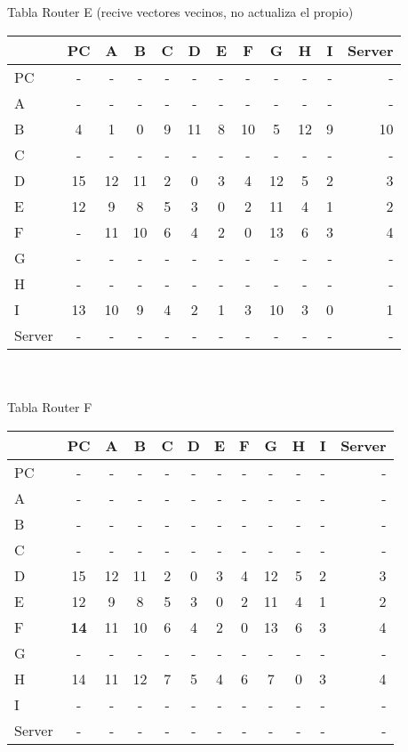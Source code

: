 \documentclass{article}
\begin{document}
\\
\\
Tabla Router E (recive vectores vecinos, no actualiza el propio) \\
\begin{tabular}{l*{10}{c}r}
              & PC & A & B & C & D & E & F & G & H & I & Server \\
\hline
PC             & - & - & - & - & - & - & - & - & - & - & -\\
A              & - & - & - & - & - & - & - & - & - & - & -\\
B              & 4 & 1 & 0 & 9 & 11	& 8 & 10 & 5 & 12 & 9 & 10\\
C              & - & - & - & - & - & - & - & - & - & - & -\\
D              & 15 & 12 & 11 & 2 & 0 & 3 & 4 & 12 & 5 & 2 & 3\\
E              & 12 & 9 & 8 & 5 & 3 & 0 & 2 & 11 & 4 & 1 & 2\\
F              & - & 11 & 10 & 6 & 4 & 2 & 0 & 13 & 6 & 3 & 4\\
G              & - & - & - & - & - & - & - & - & - & - & -\\
H              & - & - & - & - & - & - & - & - & - & - & -\\
I              & 13 & 10 & 9 & 4 & 2 & 1 & 3 & 10 & 3 & 0 & 1\\
Server         & - & - & - & - & - & - & - & - & - & - & -\\

\end{tabular}
\\
\\
Tabla Router F \\
\begin{tabular}{l*{10}{c}r}
              & PC & A & B & C & D & E & F & G & H & I & Server \\
\hline
PC             & - & - & - & - & - & - & - & - & - & - & -\\
A              & - & - & - & - & - & - & - & - & - & - & -\\
B              & - & - & - & - & - & - & - & - & - & - & -\\
C              & - & - & - & - & - & - & - & - & - & - & -\\
D              & 15 & 12 & 11 & 2 & 0 & 3 & 4 & 12 & 5 & 2 & 3\\
E              & 12 & 9 & 8 & 5 & 3 & 0 & 2 & 11 & 4 & 1 & 2\\
F              &\bf{14}& 11 & 10 & 6 & 4 & 2 & 0 & 13 & 6 & 3 & 4\\
G              & - & - & - & - & - & - & - & - & - & - & -\\
H              & 14 & 11 & 12 & 7 & 5 & 4 & 6 & 7 & 0 & 3 & 4\\
I              & - & - & - & - & - & - & - & - & - & - & -\\
Server         & - & - & - & - & - & - & - & - & - & - & -\\

\end{tabular}
\end{document}
